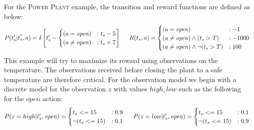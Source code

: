 \documentclass{article} %
\newcommand{\open}{\mathit{open}}
\begin{document}
For the \textsc{Power Plant} example, the transition and reward functions are defined as below:
{\footnotesize
\begin{align}
P(t_s'|\vec{t_s},a)= \delta\left[ t_s' - 
\begin{cases}
 (a=\open) &: t_s - 5 \\ 
(a \neq \open) &: t_s + 7 \\
\end{cases}
\right]\nonumber
\hspace{5mm}
R(t_s,a) = 
\begin{cases}
 (a=\open) &: -1 \\
(a \neq \open)\wedge (t_s>T) &: -1000 \\
(a \neq \open)\wedge \neg(t_s>T) &: 100 \\
\end{cases}\nonumber
\end{align}
}
This example will try to maximize its reward using observations on the temperature. The observations received before closing the plant to a safe temperature are therefore critical.  For the observation model we begin with a discrete model for the observation $z$ with values $high, low$ such as the following for the $\open$ action:  
{\footnotesize
\begin{align}
P(z=high|t_s',\open) = 
\begin{cases}
  t_s <= 15 &: 0.9 \\
 \neg (t_s <= 15)&: 0.1 \\
\end{cases}\nonumber
\hspace{5mm}
P(z=low|t_s',\open) = 
\begin{cases}
 t_s <= 15 &: 0.1 \\
 \neg (t_s <= 15) &: 0.9 \\
\end{cases}\nonumber
\end{align}
}
\end{document}
